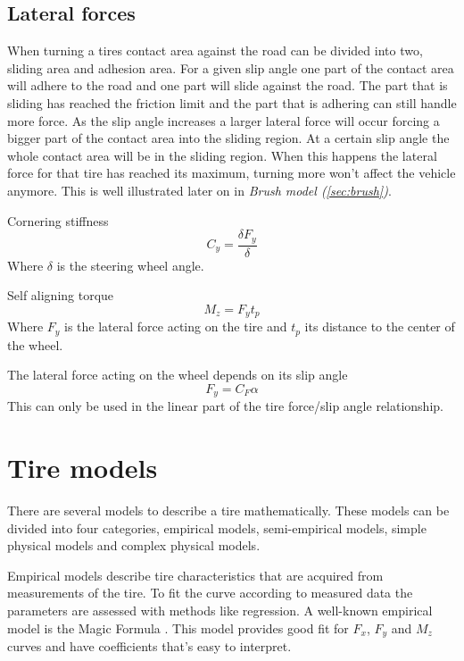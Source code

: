 \subsection{Lateral forces}
When turning a tires contact area against the road can be divided into two, sliding area and adhesion area. For a given slip angle one part of the contact area will adhere to the road and one part will slide against the road. The part that is sliding has reached the friction limit and the part that is adhering can still handle more force. As the slip angle increases a larger lateral force will occur forcing a bigger part of the contact area into the sliding region. At a certain slip angle the whole contact area will be in the sliding region. When this happens the lateral force for that tire has reached its maximum, turning more won't affect the vehicle anymore. This is well illustrated later on in \textit{Brush model (\ref{sec:brush})}.

Cornering stiffness
\begin{equation}
C_{y} = \frac{\delta F_{y}}{\delta}
\end{equation}
Where $\delta$ is the steering wheel angle.

Self aligning torque
\begin{equation}
M_{z} = F_{y}t_{p}
\end{equation}
Where $ F_{y} $  is the lateral force acting on the tire and $ t_{p} $ its distance to the center of the wheel. 

The lateral force acting on the wheel depends on its slip angle
\begin{equation}
F_{y}=C_{F}\alpha
\end{equation}
This can only be used in the linear part of the tire force/slip angle relationship. 

\section{Tire models}
There are several models to describe a tire mathematically. These models can be divided into four categories, empirical models, semi-empirical models, simple physical models and complex physical  models. 

Empirical models describe tire characteristics that are acquired from measurements of the tire. To fit the curve according to measured data the parameters are assessed with methods like regression. A well-known empirical model is the Magic Formula \cite{pacejka}. This model provides good fit for $F_{x}$, $F_{y}$ and $M_{z}$ curves and have coefficients that's easy to interpret.

